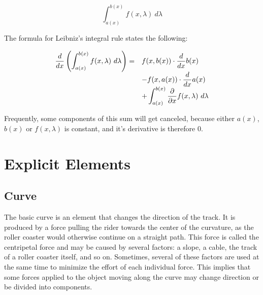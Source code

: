 \documentclass[12pt,twoside,a4paper]{article}
\newcommand{\ds}{\displaystyle}
\begin{document}
	$$\int_{a(x)}^{b(x)} f(x, \lambda)\ d\lambda$$
	
	The formula for Leibniz's integral rule states the following:
	
	$$\begin{array}{rl}
		\ds \frac{d}{dx} \left(\int_{a(x)}^{b(x)} f(x, \lambda)\ d\lambda\right) =& \ds f(x, b(x)) \cdot \frac{d}{dx}b(x) \cr
		& \ds - f(x, a(x)) \cdot \frac{d}{dx}a(x) \cr
		& \ds + \int_{a(x)}^{b(x)} \frac{\partial}{\partial x}f(x, \lambda)\ d\lambda
	\end{array}$$

	Frequently, some components of this sum will get canceled, because either $a(x)$, $b(x)$ or $f(x, \lambda)$ is constant, and it's derivative is therefore $0$.
	
	\cleardoublepage
	
	\section{Explicit Elements}
	
	\subsection{Curve}
	The basic curve is an element that changes the direction of the track. It is produced by a force pulling the rider towards the center of the curvature, as the roller coaster would otherwise continue on a straight path. This force is called the centripetal force and may be caused by several factors: a slope, a cable, the track of a roller coaster itself, and so on. Sometimes, several of these factors are used at the same time to minimize the effort of each individual force. This implies that some forces applied to the object moving along the curve may change direction or be divided into components.
	
\end{document}
